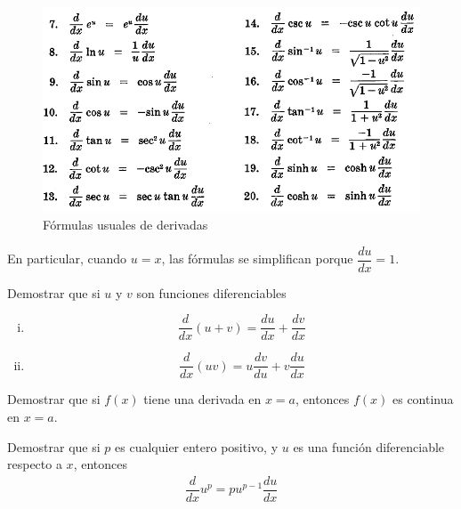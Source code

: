 {}
  \begin{figure}
 \centering
 \includegraphics[width=.7\textwidth,keepaspectratio=true]{./calculo/formulas_derivadas_02.png}
 \caption{Fórmulas usuales de derivadas}
 \label{fig:formulas_derivadas_02}
\end{figure}



{}
  En particular, cuando $u=x$, las fórmulas se simplifican porque $\dfrac{du}{dx}=1$.


  \begin{resuelto}
   Demostrar que si $u$ y $v$ son funciones diferenciables
   \begin{enumerate}[(i)]
     \item \[\dfrac{d}{dx}\left( u+v \right) =
     \dfrac{du}{dx}+\dfrac{dv}{dx}\]

     \item \[\dfrac{d}{dx}\left( uv \right) = u\dfrac{dv}{du}+v\dfrac{du}{dx}
     \]
\end{enumerate}
  \end{resuelto}



{}
  \begin{resuelto}
   Demostrar que si $f(x)$ tiene una derivada en $x=a$, entonces $f(x)$ es continua en $x=a$.
  \end{resuelto}



{}
  \begin{resuelto}
   Demostrar que si $p$ es cualquier entero positivo, y $u$ es una función diferenciable respecto a $x$, entonces
   \begin{align}
    \dfrac{d}{dx}u^{p}=pu^{p-1}\dfrac{du}{dx}
    \end{align}
  \end{resuelto}



{}
